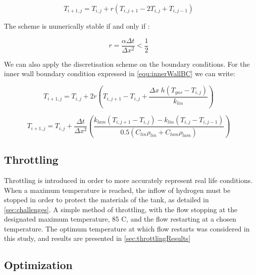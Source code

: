\begin{equation}
T_{i+1,j}= T_{i,j} +  r \left(T_{i,j+1}-2T_{i,j} + T_{i,j-1} \right)
\end{equation}

The scheme is numerically stable if and only if \cite{smith1965}:

\begin{equation}
r = \frac{\alpha \Delta t}{ \Delta x^2} < \frac{1}{2}
\end{equation}



We can also apply the discretisation scheme on the boundary conditions. For the inner wall boundary condition expressed in \cref{equ:innerWallBC} we can write: 

\begin{equation}
T_{i+1,j}= T_{i,j} + 2r\left(T_{i,j+1} - T_{i,j} + \frac{\Delta x \; h \left( T_{gas} - T_{i,j}\right) }{k_{lin}}\right)
\end{equation}


\begin{equation}
T_{i+1,j}= T_{i,j} + \frac{\Delta t}{\Delta x^2} \left( \frac{k_{lam} \left(T_{i,j+1} - T_{i,j} \right) - k_{lin} \left(T_{i,j} - T_{i,j-1} \right)}{0.5 \left( C_{lin} \rho_{lin} + C_{lam} \rho_{lam} \right)} \right)
\end{equation}




\subsection{Throttling}

Throttling is introduced in order to more accurately represent real life conditions. When a maximum temperature is reached, the inflow of hydrogen must be stopped in order to protect the materials of the tank, as detailed in \cref{sec:challenges}. A simple method of throttling, with the flow stopping at the designated maximum temperature, 85 \degree C, and the flow restarting at a chosen temperature. The optimum temperature at which flow restarts was considered in this study, and results are presented in \cref{sec:throttlingResults}


\subsection{Optimization}

